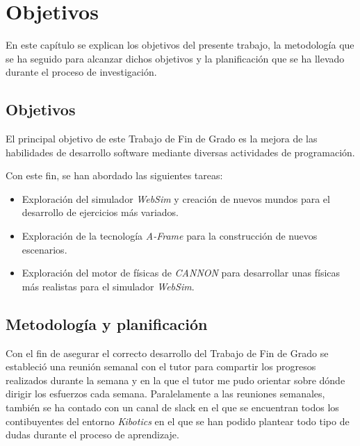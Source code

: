 \chapter{Objetivos}
\label{chap:objetivos} 
En este capítulo se explican los objetivos del presente trabajo, la metodología que se ha seguido para alcanzar dichos objetivos y la planificación que se ha llevado durante el proceso de investigación.
   
\section{Objetivos}
El principal objetivo de este Trabajo de Fin de Grado es la mejora de las habilidades de desarrollo software mediante diversas actividades de programación. \newline



Con este fin, se han abordado las siguientes tareas:
\begin{itemize}
    \item Exploración del simulador \textit{WebSim} y creación de nuevos mundos para el desarrollo de ejercicios más variados.
    \item Exploración de la tecnología \textit{A-Frame} para la construcción de nuevos escenarios.
    \item Exploración del motor de físicas de \textit{CANNON} para desarrollar unas físicas más realistas para el simulador \textit{WebSim}.
\end{itemize}

\section{Metodología y planificación}
Con el fin de asegurar el correcto desarrollo del Trabajo de Fin de Grado se estableció una reunión semanal con el tutor para compartir los progresos realizados durante la semana y en la que el tutor me pudo orientar sobre dónde dirigir los esfuerzos cada semana. Paralelamente a las reuniones semanales, también se ha contado con un canal de slack en el que se encuentran todos los contibuyentes del entorno \textit{Kibotics} en el que se han podido plantear todo tipo de dudas durante el proceso de aprendizaje. \newline


